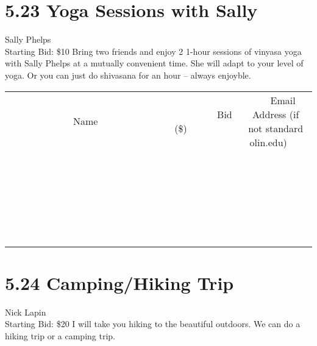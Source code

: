 \documentclass[11pt]{article}
\begin{document}
\section*{5.23 Yoga Sessions with Sally}
Sally Phelps
\\
Starting Bid: \$10
\newline
Bring two friends and enjoy 2  1-hour sessions of vinyasa yoga with Sally Phelps at a mutually convenient time.  She will adapt to your level of yoga.  Or you can just do shivasana for an hour – always enjoyble.
\\[6ex]
\begin{tabular}{c c c}
~~~~~~~~~~~~~Name~~~~~~~~~~~~~ & ~~~~~~~~~Bid (\$)~~~~~~~~~  & ~~~Email Address (if not standard olin.edu)~~~\\
 & & \\
\hline
 & & \\
\hline
 & & \\
\hline
 & & \\
\hline
 & & \\
\hline
 & & \\
\hline
 & & \\
\hline
 & & \\
\hline
 & & \\
\hline
 & & \\
\hline
 & & \\
\hline
 & & \\
\hline
 & & \\
\hline
 & & \\
\hline
 & & \\
\hline
 & & \\
\hline
 & & \\
\hline
 & & \\
\hline
 & & \\
\hline
 & & \\
\hline
 & & \\
\hline
 & & \\
\hline
 & & \\
\hline
 & & \\
\hline
 & & \\
\hline
 & & \\
\hline
\end{tabular}
\newpage
\section*{5.24 Camping/Hiking Trip}
Nick Lapin
\\
Starting Bid: \$20
\newline
I will take you hiking to the beautiful outdoors. We can do a hiking trip or a camping trip. 
\end{document}
